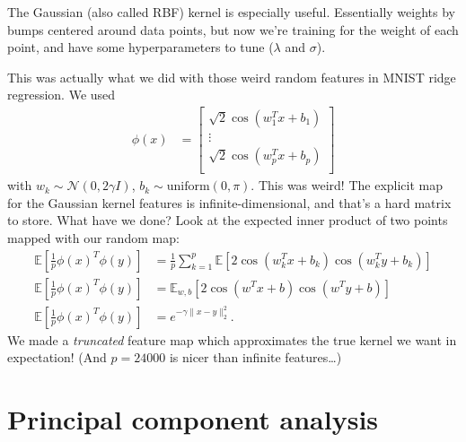 \documentclass[11pt,letterpaper]{article}
\theoremstyle{definition}
\numberwithin{equation}{section}
\numberwithin{figure}{section}
\begin{document}
The Gaussian (also called RBF) kernel is especially useful. Essentially weights by bumps centered around data points, but now we're training for the weight of each point, and have some hyperparameters to tune ($\lambda$ and $\sigma$).

This was actually what we did with those weird random features in MNIST ridge regression. We used
%
\begin{align}
	\phi(x) &= \begin{bmatrix}\sqrt{2}\cos(w_1^T x + b_1)\\\vdots\\\sqrt{2}\cos(w_p^T x + b_p)\\\end{bmatrix}
\end{align}
%
with $w_k \sim \mathcal{N}(0,2\gamma I)$, $b_k \sim \mathrm{uniform}(0,\pi)$. This was weird! The explicit map for the Gaussian kernel features is infinite-dimensional, and that's a hard matrix to store. What have we done? Look at the expected inner product of two points mapped with our random map:
%
\begin{align}
	\mathbb{E}\left[\frac{1}{p}\phi(x)^T \phi(y)\right] &= \frac{1}{p} \sum_{k=1}^p \mathbb{E}\left[2\cos(w_k^T x + b_k)\cos(w_k^T y + b_k)\right]\\
	\mathbb{E}\left[\frac{1}{p}\phi(x)^T \phi(y)\right] &= \mathbb{E}_{w,b} \left[2\cos(w^T x + b)\cos(w^T y + b)\right]\\
	\mathbb{E}\left[\frac{1}{p}\phi(x)^T \phi(y)\right] &= e^{-\gamma\|x-y\|_2^2}.
\end{align}
%
We made a \emph{truncated} feature map which approximates the true kernel we want in expectation! (And $p=24000$ is nicer than infinite features\ldots)





















\section{Principal component analysis}
\end{document}
